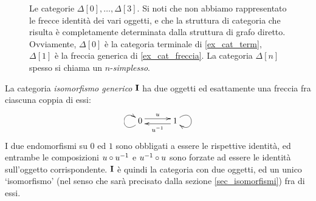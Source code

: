 \begin{example}
\begin{figure}[h]
\begin{center}
		\end{center}
		\caption{Le categorie \(\Delta[0], \dots,\Delta[3]\). Si noti che non abbiamo rappresentato le frecce identità dei vari oggetti, e che la struttura di categoria che risulta è completamente determinata dalla struttura di grafo diretto. Ovviamente, \(\Delta[0]\) è la categoria terminale di \ref{ex_cat_term}, \(\Delta[1]\) è la freccia generica di \ref{ex_cat_freccia}. La categoria \(\Delta[n]\) spesso si chiama un \(n\)-\emph{simplesso}. }
		\label{fig:le_delta}
	\end{figure}
\end{example}
\begin{example}\label{ex_cat_iso}
	La categoria \emph{isomorfismo generico} \(\mathbf{I}\) ha due oggetti ed esattamente una freccia fra ciascuna coppia di essi:
	\[\xymatrix@C=7ex{0 \ar@<.7ex>[r]^u \ar@(dl,ul)[] & 1 \ar@<.7ex>[l]^{u^{-1}} \ar@(ur,dr)[]}\]
	I due endomorfismi su \(0\) ed \(1\) sono obbligati a essere le rispettive identità, ed entrambe le composizioni \(u\circ u^{-1}\) e \(u^{-1}\circ u\) sono forzate ad essere le identità sull'oggetto corrispondente. \(\mathbf{I}\) è quindi la categoria con due oggetti, ed un unico `isomorfismo' (nel senso che sarà precisato dalla sezione \ref{sec_isomorfismi}) fra di essi.
\end{example}
